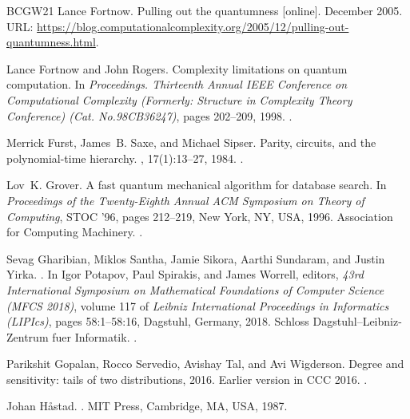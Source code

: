 \documentclass[10pt,a4paper]{article}
\begin{document}
\begin{thebibliography}{BCGW21}
Lance Fortnow.
\newblock Pulling out the quantumness [online].
\newblock December 2005.
\newblock URL:
  \url{https://blog.computationalcomplexity.org/2005/12/pulling-out-quantumness.html}.

Lance Fortnow and John Rogers.
\newblock Complexity limitations on quantum computation.
\newblock In {\em Proceedings. Thirteenth Annual IEEE Conference on
  Computational Complexity (Formerly: Structure in Complexity Theory
  Conference) (Cat. No.98CB36247)}, pages 202--209, 1998.
\newblock \href {https://doi.org/10.1109/CCC.1998.694606}
  {}.

Merrick Furst, James~B. Saxe, and Michael Sipser.
\newblock Parity, circuits, and the polynomial-time hierarchy.
, 17(1):13--27, 1984.
\newblock \href {https://doi.org/10.1007/BF01744431}
  {}.

Lov~K. Grover.
\newblock A fast quantum mechanical algorithm for database search.
\newblock In {\em Proceedings of the Twenty-Eighth Annual ACM Symposium on
  Theory of Computing}, STOC '96, pages 212--219, New York, NY, USA, 1996.
  Association for Computing Machinery.
\newblock \href {https://doi.org/10.1145/237814.237866}
  {}.

Sevag Gharibian, Miklos Santha, Jamie Sikora, Aarthi Sundaram, and Justin
  Yirka.
.
\newblock In Igor Potapov, Paul Spirakis, and James Worrell, editors, {\em 43rd
  International Symposium on Mathematical Foundations of Computer Science (MFCS
  2018)}, volume 117 of {\em Leibniz International Proceedings in Informatics
  (LIPIcs)}, pages 58:1--58:16, Dagstuhl, Germany, 2018. Schloss
  Dagstuhl--Leibniz-Zentrum fuer Informatik.
\newblock \href {https://doi.org/10.4230/LIPIcs.MFCS.2018.58}
  {}.

Parikshit Gopalan, Rocco Servedio, Avishay Tal, and Avi Wigderson.
\newblock Degree and sensitivity: tails of two distributions, 2016.
\newblock Earlier version in CCC 2016.
\newblock \href {https://arxiv.org/abs/1604.07432} {}.

Johan H{\r{a}}stad.
.
\newblock MIT Press, Cambridge, MA, USA, 1987.


\end{thebibliography}
\end{document}
